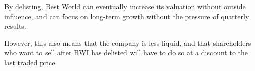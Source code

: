 By delisting, Best World can eventually increase its valuation without outside influence, and can focus on long-term growth without the pressure of quarterly results.

However, this also means that the company is less liquid, and that shareholders who want to sell after BWI has delisted will have to do so at a discount to the last traded price.

% 
% 
% 
% 
